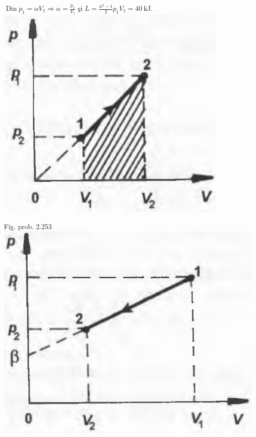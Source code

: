 \documentclass[10pt]{article}
\begin{document}
$\operatorname{Din} p_{1}=\alpha V_{1} \Rightarrow \alpha=\frac{p_{1}}{V_{1}}$ şi $L=\frac{n^{2}-1}{2} p_{1} V_{1}=40 \mathrm{~kJ}$.\\
\includegraphics[max width=\textwidth, center]{2025_07_01_5b3ff9fa0d508c8e9f17g-325(1)}

Fig. prob. 2.253\\
\includegraphics[max width=\textwidth, center]{2025_07_01_5b3ff9fa0d508c8e9f17g-325}
\end{document}
